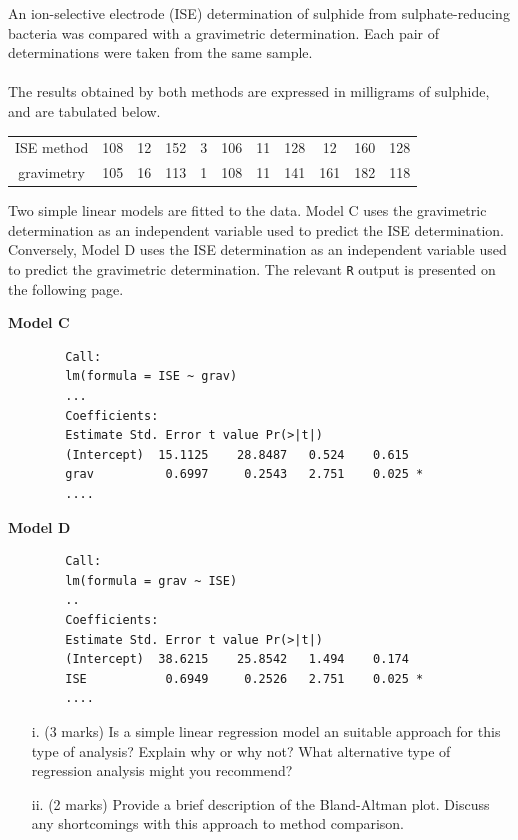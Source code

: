 \documentclass[a4paper,12pt]{article}
\begin{document}
An ion-selective electrode (ISE) determination of sulphide from sulphate-reducing bacteria was compared with a gravimetric determination. Each pair of determinations were taken from the same sample. \\ \\The results obtained by both methods are expressed in milligrams of sulphide, and are tabulated below.
\begin{center}
	\begin{tabular}{|c|cccccccccc|}
		\hline
		ISE method & 108 & 12& 152 & 3 & 106 & 11 &  128 & 12& 160& 128 \\
		gravimetry & 105 & 16& 113 & 1 & 108 &  11 & 141 & 161 & 182& 118\\
		\hline
	\end{tabular}
\end{center}
Two simple linear models are fitted to the data. Model C uses the gravimetric determination as an independent variable used to predict the ISE determination. Conversely, Model D uses the ISE determination as an independent variable used to predict the gravimetric determination. The relevant \texttt{R} output is presented on the following page.

\begin{itemize}
\end{itemize}

\begin{itemize}
	\item[i.] (3 marks) Is a simple linear regression model an suitable approach for this type of analysis? Explain why or why not? What alternative type of regression analysis might you recommend?
	\item[ii.] (2 marks) Provide a brief description of the Bland-Altman plot. Discuss any shortcomings with this approach to method comparison.
\end{itemize}
\end{document}
